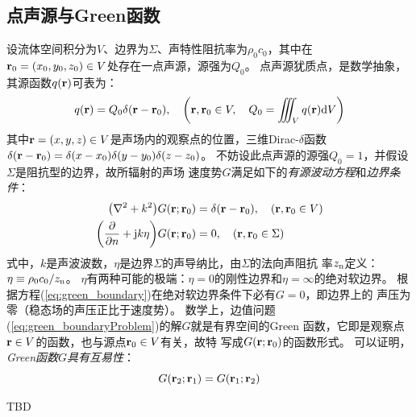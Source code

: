 \documentclass[UTF8]{ctexbook}
\begin{document}
\subsection{点声源与Green函数}
设流体空间积分为$V$、边界为$\Sigma$、声特性阻抗率为$\rho_0c_0$，其中在
$\vb{r}_0=(x_0,y_0,z_0)\in V$处存在一点声源，源强为$Q_0$。
点声源犹质点，是数学抽象，其源函数$q(\vb{r})$可表为：
$$q(\vb{r}) = Q_0 \delta(\vb{r}-\vb{r}_0)\qc
\qty(\vb{r},\vb{r}_0\in V\qc Q_0 = \iiint_V q(\vb{r})\dd V)$$
其中$\vb{r}=(x,y,z)\in V$是声场内的观察点的位置，三维Dirac-$\delta$函数
$\delta(\vb{r}-\vb{r}_0)= \delta(x-x_0)\delta(y-y_0)\delta(z-z_0)$。
不妨设此点声源的源强$Q_0=1$，并假设$\Sigma$是阻抗型的边界，故所辐射的声场
速度势$G$满足如下的\emph{有源波动方程}和\emph{边界条件}：
\begin{subequations}
	\begin{align}
		\qty(\laplacian + k^2)G(\vb{r};\vb{r}_0) & = \delta (\vb{r}-\vb{r}_0)
		\qc \qty(\vb{r},\vb{r}_0\in V)\\
		\qty(\pdv{n} +\mj k \eta )G(\vb{r};\vb{r}_0) & = 0 
		\qc \qty(\vb{r},\vb{r}_0\in \Sigma)\label{eq:green_boundary}
	\end{align}
	\label{eq:green_boundaryProblem}
\end{subequations}式中，$k$是声波波数，$\eta$是边界$\Sigma$的声导纳比，由$\Sigma$的法向声阻抗
率$z_\text{n}$定义：$\eta\equiv \rho_0c_0/z_\text{n}$。
$\eta$有两种可能的极端：$\eta=0$的刚性边界和$\eta=\infty$的绝对软边界。
根据方程(\ref{eq:green_boundary})在绝对软边界条件下必有$G=0$，即边界上的
声压为零（稳态场的声压正比于速度势）。
数学上，边值问题(\ref{eq:green_boundaryProblem})的解$G$就是有界空间的Green
函数，它即是观察点$\vb{r}\in V$的函数，也与源点$\vb{r}_0 \in V$有关，故特
写成$G(\vb{r};\vb{r}_0)$的函数形式。
可以证明，\emph{Green函数$G$具有互易性}：
$$G(\vb{r}_2;\vb{r}_1) = G(\vb{r}_1;\vb{r}_2)$$


TBD
\end{document}
